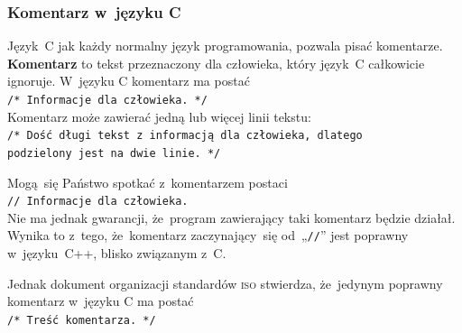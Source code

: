 \documentclass[10pt,t]{beamer}
\begin{document}






\begin{frame}
  \frametitle{Komentarz w~języku C}


  Język~C jak każdy normalny język programowania, pozwala pisać komentarze.
  \textbf{Komentarz} to tekst przeznaczony dla człowieka, który język~C
  całkowicie ignoruje. W~języku C komentarz ma postać \\
  \texttt{/* Informacje dla człowieka. */} \\
  Komentarz może zawierać jedną lub więcej linii tekstu: \\
  \texttt{/* Dość długi tekst z informacją dla człowieka, dlatego \\
    podzielony jest na dwie linie. */}

  Mogą~się Państwo spotkać z~komentarzem postaci \\
  \texttt{// Informacje dla człowieka.} \\
  Nie ma jednak gwarancji, że~program zawierający taki komentarz będzie
  działał. Wynika to z~tego, że~komentarz zaczynający~się od~„\texttt{//}”
  jest poprawny w~języku~C++, blisko związanym z~C.

  Jednak dokument organizacji standardów \textsc{iso} stwierdza,
  że~jedynym poprawny komentarz w~języku C ma postać \\
  \texttt{/* Treść komentarza. */}

\end{frame}
\end{document}
